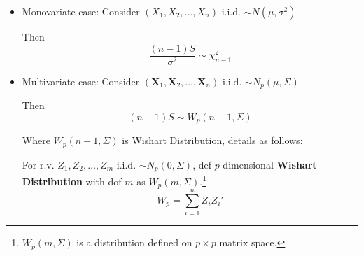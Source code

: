 \begin{itemize}[topsep=2pt,itemsep=2pt]
    \item Monovariate case: Consider $ (X_1,X_2,\ldots,X_n) $ i.i.d. $ \sim N(\mu,\sigma ^2) $

    
    

    Then 
    \begin{equation}
        \dfrac{(n-1)S}{\sigma ^2}\sim \chi^2_{n-1} 
    \end{equation}
    
    \item Multivariate case: Consider $ (\mathbf{X}_{1},\mathbf{X}_{2},\ldots,\mathbf{X}_{n})  $ i.i.d. $ \sim N_p(\mu,\Sigma ) $
    
    Then
    \begin{equation}
        (n-1) S\sim W_p(n-1,\Sigma )
    \end{equation}
    
    Where $ W_p(n-1,\Sigma ) $ is Wishart Distribution, details as follows:

         For r.v. $ Z_1,Z_2,\ldots,Z_m $ i.i.d. $ \sim N_p(0,\Sigma  ) $, def $ p $ dimensional \textbf{Wishart Distribution } with dof $ m $ as $ W_p(m,\Sigma ) $.\footnote{$ W_p(m,\Sigma ) $ is a distribution defined on $ p\times p $ matrix space.}
        \begin{equation}
            W_p=\sum_{i=1}^nZ_iZ_i' 
        \end{equation}


\end{itemize}
